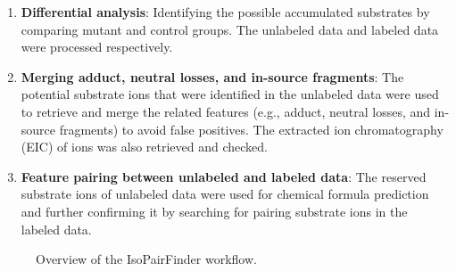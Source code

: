 \documentclass[
  letterpaper,
  DIV=11,
  numbers=noendperiod]{scrreprt}
\providecommand{\tightlist}{%
  \setlength{\itemsep}{0pt}\setlength{\parskip}{0pt}}
\begin{document}
\begin{enumerate}
\def\labelenumi{\arabic{enumi}.}
\tightlist
\item
  \textbf{Differential analysis}: Identifying the possible accumulated
  substrates by comparing mutant and control groups. The unlabeled data
  and labeled data were processed respectively.
\item
  \textbf{Merging adduct, neutral losses, and in-source fragments}: The
  potential substrate ions that were identified in the unlabeled data
  were used to retrieve and merge the related features (e.g., adduct,
  neutral losses, and in-source fragments) to avoid false positives. The
  extracted ion chromatography (EIC) of ions was also retrieved and
  checked.
\item
  \textbf{Feature pairing between unlabeled and labeled data}: The
  reserved substrate ions of unlabeled data were used for chemical
  formula prediction and further confirming it by searching for pairing
  substrate ions in the labeled data.
\end{enumerate}

\begin{figure}


\caption{\label{fig-figure3-1}Overview of the IsoPairFinder workflow.}

\end{figure}%
\end{document}
